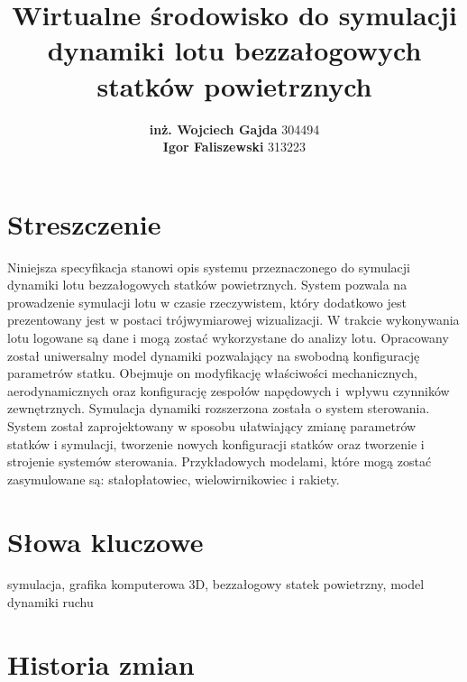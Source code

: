 \documentclass[15pt]{sprawozdanie}
\title{Wirtualne środowisko do symulacji dynamiki lotu bezzałogowych statków powietrznych}
\author{\textbf{inż. Wojciech Gajda} 304494\\\vspace{20pt}\textbf{Igor Faliszewski} 313223}
\begin{document}
\maketitle
%


\section*{Streszczenie}
Niniejsza specyfikacja stanowi opis systemu przeznaczonego do symulacji dynamiki lotu bezzałogowych statków powietrznych. System pozwala na prowadzenie symulacji lotu w czasie rzeczywistem, który dodatkowo jest prezentowany jest w postaci trójwymiarowej wizualizacji. W trakcie wykonywania lotu logowane są dane i mogą zostać wykorzystane do analizy lotu. Opracowany został uniwersalny model dynamiki pozwalający na swobodną konfigurację parametrów statku. Obejmuje on modyfikację właściwości mechanicznych, aerodynamicznych oraz konfigurację zespołów napędowych i~wpływu czynników zewnętrznych. Symulacja dynamiki rozszerzona została o system sterowania. System został zaprojektowany w sposobu ułatwiający zmianę parametrów statków i symulacji, tworzenie nowych konfiguracji statków oraz tworzenie i strojenie systemów sterowania. Przykładowych modelami, które mogą zostać zasymulowane są: stałopłatowiec, wielowirnikowiec i rakiety. 

\section*{Słowa kluczowe}

symulacja, grafika komputerowa 3D, bezzałogowy statek powietrzny, model dynamiki ruchu




\newpage
\tableofcontents

\newpage

\section{Historia zmian}
\end{document}
